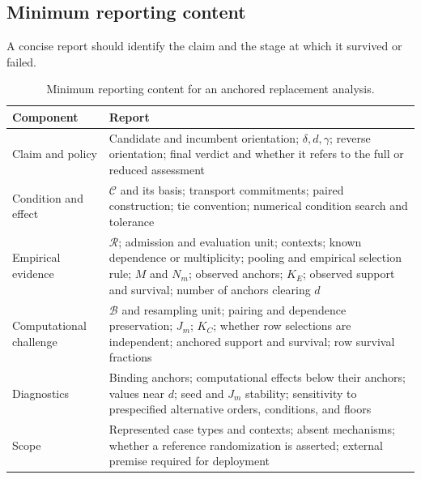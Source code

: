 \documentclass[11pt]{article}
\newcommand{\Regime}{\mathcal{R}}
\newcommand{\CSet}{\mathcal{C}}
\newcommand{\Boot}{\mathcal{B}}
\theoremstyle{remark}
\begin{document}
\subsection{Minimum reporting content}

A concise report should identify the claim and the stage at which it survived
or failed.

\begin{table}[htbp]
\centering
\caption{Minimum reporting content for an anchored replacement analysis.}
\label{tab:reporting}
\begin{tabularx}{\textwidth}{@{}>{\raggedright\arraybackslash}p{}>{\raggedright\arraybackslash}X@{}}
\toprule
Component & Report \\
\midrule
Claim and policy & Candidate and incumbent orientation; $\delta,d,\gamma$; reverse orientation; final verdict and whether it refers to the full or reduced assessment \\
Condition and effect & $\CSet$ and its basis; transport commitments; paired construction; tie convention; numerical condition search and tolerance \\
Empirical evidence & $\Regime$; admission and evaluation unit; contexts; known dependence or multiplicity; pooling and empirical selection rule; $M$ and $N_m$; observed anchors; $K_E$; observed support and survival; number of anchors clearing $d$ \\
Computational challenge & $\Boot$ and resampling unit; pairing and dependence preservation; $J_m$; $K_C$; whether row selections are independent; anchored support and survival; row survival fractions \\
Diagnostics & Binding anchors; computational effects below their anchors; values near $d$; seed and $J_m$ stability; sensitivity to prespecified alternative orders, conditions, and floors \\
Scope & Represented case types and contexts; absent mechanisms; whether a reference randomization is asserted; external premise required for deployment \\
\bottomrule
\end{tabularx}
\end{table}
\end{document}
